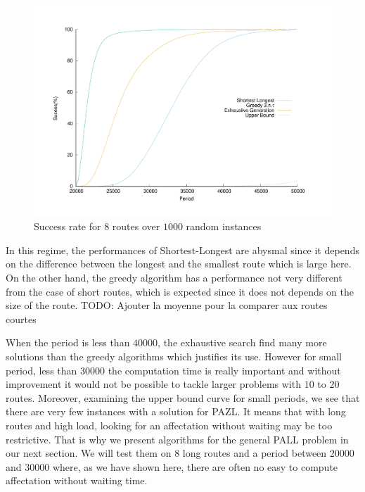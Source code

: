 \documentclass[a4paper,10pt]{article}
\newcommand{\todo}[1]{{\color{red} TODO: {#1}}}
\begin{document}
\begin{figure}

       \begin{center}
      \includegraphics[scale=0.4]{echec_longues.pdf}
      \end{center}
      \caption{Success rate for $8$ routes over $1000$ random instances}
     \end{figure}
      
      In this regime, the performances of Shortest-Longest are abysmal since it depends on the difference between the longest and the smallest route
      which is large here. On the other hand, the greedy algorithm has a performance not very different from the case of short routes, which is expected since it does not depends on the size of the route.  \todo{Ajouter la moyenne pour la comparer aux routes courtes}
      
      When the period is less than $40000$, the exhaustive search find many more solutions than the greedy algorithms which justifies its use. 
      However for small period, less than $30000$ the computation time is really important and without improvement it would not be possible to tackle 
      larger problems with $10$ to $20$ routes. Moreover, examining the upper bound curve for small periods, we see that there are very few instances
      with a solution for PAZL. It means that with long routes and high load, looking for an affectation without waiting may be too restrictive.
      That is why we present algorithms for the general PALL problem in our next section. We will test them on $8$ long routes and a period between 
      $20000$ and $30000$ where, as we have shown here, there are often no easy to compute affectation without waiting time.
      
\end{document}

